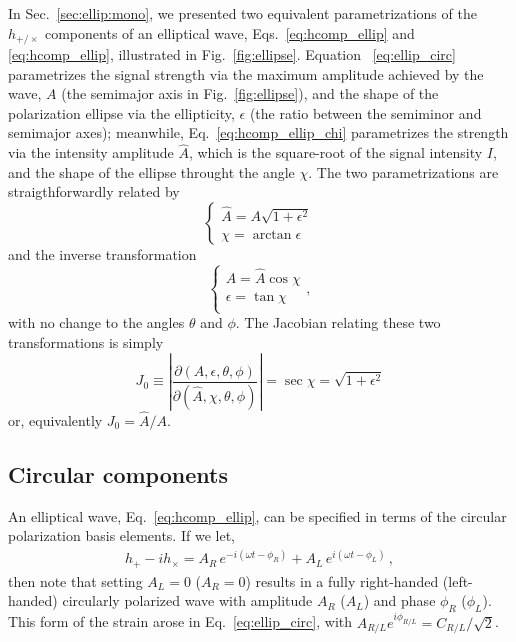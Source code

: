 \documentclass[aps,prd,twocolumn,superscriptaddress,preprintnumbers,floatfix,nofootinbib]{revtex4-2}
\begin{document}
In Sec.~\ref{sec:ellip:mono}, we presented two equivalent parametrizations of the $h_{+/\times}$ components of an elliptical wave, Eqs.~\eqref{eq:hcomp_ellip} and \eqref{eq:hcomp_ellip}, illustrated in Fig.~\ref{fig:ellipse}.
Equation ~\eqref{eq:ellip_circ} parametrizes the signal strength via the maximum amplitude achieved by the wave, $A$ (the semimajor axis in Fig.~\ref{fig:ellipse}), and the shape of the polarization ellipse via the ellipticity, $\epsilon$ (the ratio between the semiminor and semimajor axes);
meanwhile, Eq.~\eqref{eq:hcomp_ellip_chi} parametrizes the strength via the intensity amplitude $\hat{A}$, which is the square-root of the signal intensity $I$, and the shape of the ellipse throught the angle $\chi$.
The two parametrizations are straigthforwardly related by
\begin{equation} \label{eq:Aellip_Ahatchi}
\begin{cases}
\hat{A} = A \sqrt{1 + \epsilon^2} \\
\chi = \arctan \epsilon 
\end{cases} 
\end{equation}
and the inverse transformation
\begin{equation} \label{eq:Ahatchi_Aellip}
\begin{cases}
A = \hat{A} \cos \chi \\
\epsilon = \tan \chi \\
\end{cases} ,
\end{equation}
with no change to the angles $\theta$ and $\phi$.
The Jacobian relating these two transformations is simply
\begin{equation} \label{eq:jac_Aeps_Achi}
J_0 \equiv \left| \frac{\partial(A,\epsilon,\theta,\phi)}{\partial(\hat{A}, \chi, \theta, \phi)}\right| =  \sec \chi = \sqrt{1 + \epsilon^2}
\end{equation}
or, equivalently $J_0 = \hat{A}/A$.



\subsection{Circular components}

An elliptical wave, Eq.~\eqref{eq:hcomp_ellip}, can be specified in terms of the circular polarization basis elements.
If we let,
\begin{align} \label{eq:Cphi}
h_+ - i h_\times = A_{R}\, e^{-i \left(\omega t - \phi_R \right) } + A_{L}\, e^{i \left(\omega t - \phi_L \right) }\, ,
\end{align}
then note that setting $A_L = 0$ ($A_R =0$) results in a fully right-handed (left-handed) circularly polarized wave with amplitude $A_R$ ($A_L$) and phase $\phi_R$ ($\phi_L$).
This form of the strain arose in Eq.~\eqref{eq:ellip_circ}, with $A_{R/L} e^{i\phi_{R/L}} = C_{R/L}/\sqrt{2}$.
\end{document}
